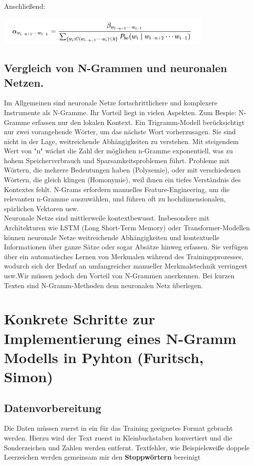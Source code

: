 \documentclass[12pt]{article}
\begin{document}
Anschließend:

\begin{center}
	\includegraphics[width=0.8\textwidth]{statics/Borisov/11.PNG}
\end{center}

\subsection{Vergleich von N-Grammen und neuronalen Netzen.}
\quad Im Allgemeinen sind neuronale Netze fortschrittlichere und komplexere Instrumente als N-Gramme. Ihr Vorteil liegt in vielen Aspekten. Zum Bespie: N-Gramme erfassen nur den lokalen Kontext. Ein Trigramm-Modell berücksichtigt nur zwei vorangehende Wörter, um das nächste Wort vorherzusagen. Sie sind nicht in der Lage, weitreichende Abhängigkeiten zu verstehen. Mit steigendem Wert von "n" wächst die Zahl der möglichen n-Gramme exponentiell, was zu hohem Speicherverbrauch und Sparsamkeitsproblemen führt. Probleme mit Wörtern, die mehrere Bedeutungen haben (Polysemie), oder mit verschiedenen Wörtern, die gleich klingen (Homonymie), weil ihnen ein tiefes Verständnis des Kontextes fehlt. N-Grams erfordern manuelles Feature-Engineering, um die relevanten n-Gramme auszuwählen, und führen oft zu hochdimensionalen, spärlichen Vektoren usw. \cite{roshmita2023} \cite{clarkGiorgoloLappin}
\\
\quad Neuronale Netze sind mittlerweile kontextbewusst. Insbesondere mit Architekturen wie LSTM (Long Short-Term Memory) oder Transformer-Modellen können neuronale Netze weitreichende Abhängigkeiten und kontextuelle Informationen über ganze Sätze oder sogar Absätze hinweg erfassen. Sie verfügen über ein automatisches Lernen von Merkmalen während des Trainingsprozesses, wodurch sich der Bedarf an umfangreicher manueller Merkmalstechnik verringert usw.Wir müssen jedoch den Vorteil von N-Grammen anerkennen. Bei kurzen Texten sind N-Gramm-Methoden dem neuronalen Netz überlegen.
\cite{babukumar2010}


\section{Konkrete Schritte zur Implementierung eines N-Gramm Modells in Pyhton (Furitsch, Simon)}
\subsection{Datenvorbereitung}
\quad Die Daten müssen zuerst in ein für das Training geeignetes Format gebracht werden. Hierzu wird der Text zuerst in Kleinbuchstaben konvertiert und die Sonderzeichen und Zahlen werden entfernt. Textfehler, wie Beispielsweiße doppele Leerzeichen werden gemeinsam mir den \textbf{Stoppwörtern} bereinigt
\end{document}
